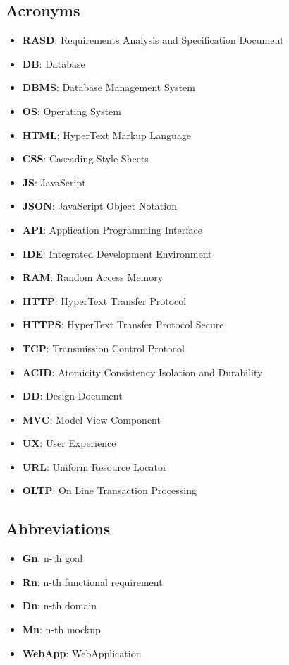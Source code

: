 \documentclass[numbers=noenddot, 12pt, a4paper, oneside]{scrbook}
\begin{document}
\subsection*{Acronyms}

\begin{itemize}
	\item \textbf{RASD}: Requirements Analysis and Specification Document
	\item \textbf{DB}: Database
	\item \textbf{DBMS}: Database Management System
	\item \textbf{OS}: Operating System
	\item \textbf{HTML}: HyperText Markup Language
	\item \textbf{CSS}: Cascading Style Sheets
	\item \textbf{JS}: JavaScript
	\item \textbf{JSON}: JavaScript Object Notation
	\item \textbf{API}: Application Programming Interface
	\item \textbf{IDE}: Integrated Development Environment
	\item \textbf{RAM}: Random Access Memory
	\item \textbf{HTTP}: HyperText Transfer Protocol
	\item \textbf{HTTPS}: HyperText Transfer Protocol Secure
	\item \textbf{TCP}: Transmission Control Protocol
	\item \textbf{ACID}: Atomicity Consistency Isolation and Durability
	\item \textbf{DD}: Design Document
	\item \textbf{MVC}: Model View Component
	\item \textbf{UX}: User Experience
	\item \textbf{URL}: Uniform Resource Locator
	\item \textbf{OLTP}: On Line Transaction Processing

\end{itemize}

\subsection*{Abbreviations}
\begin{itemize}
	\item \textbf{Gn}: n-th goal
	\item \textbf{Rn}: n-th functional requirement
	\item \textbf{Dn}: n-th domain
	\item \textbf{Mn}: n-th mockup
	\item \textbf{WebApp}: WebApplication
\end{itemize}
\end{document}
